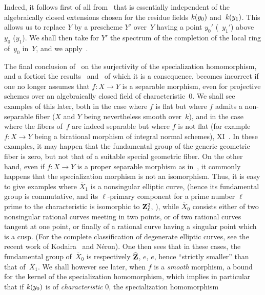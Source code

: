 Indeed, it follows first of all from~ that  is
essentially independent of the algebraically closed extensions
chosen for the residue fields $\mathit{k}(y_0)$
and~$\mathit{k}(y_1)$. This allows us to replace $Y$ by a
prescheme $Y'$ over~$Y$ having a point $y_0'$ (\resp~$y_1'$)
above~$y_0$ (\resp $y_1$). We shall then take for $Y'$ the
spectrum of the completion of the local ring of~$y_0$ in~$Y$, and we
apply~.

\begin{remarks}
\label{X.2.5}
The final conclusion of~ on the surjectivity of
the specialization homomorphism, and a fortiori the
results~ and~ of which it is a
consequence, becomes incorrect if one no longer assumes that $f\colon
X\to Y$ is a separable morphism, even for
projective schemes over an algebraically closed field of
characteristic~$0$. We shall see examples of this later, both
in the case where $f$ is flat but where $f$ admits a non-separable
fiber ($X$ and $Y$ being nevertheless smooth over~$k$), and
in the case where the fibers of~$f$ are indeed separable but
where $f$ is not flat (for example $f\colon X\to Y$ being a
birational morphism of integral normal schemes),
\cf XI~. In these examples, it may happen that the
fundamental group of the generic geometric fiber is
zero, but not that of a suitable special geometric
fiber. On the other hand, even if $f\colon X\to Y$ is a
proper separable morphism as in~, it
commonly happens that the specialization morphism is
not an isomorphism. Thus, it is easy to give examples
where $\overline X_1$ is a nonsingular elliptic curve,
(hence its fundamental group is commutative, and its
$\ell$-primary component for a prime number $\ell$ prime to the
characteristic is isomorphic to $\mathbf{Z}_\ell^2$, \cf {}),
while $\overline X_0$ consists either of two nonsingular
rational curves meeting in two points, or of
two rational curves tangent at one point, or finally of a
rational curve having a singular point which is a cusp.
(For the complete classification of degenerate elliptic
curves, see the recent work of Kodaira~\cite{X.1} and N\'eron).
One then sees that in these cases, the
fundamental group of~$\overline X_0$ is respectively $\widehat{\mathbf{Z}}$,
$e$, $e$, hence ``strictly smaller'' than that of~$\overline
X_1$. We shall however see later, when $f$ is a
\emph{smooth} morphism, a bound for the kernel of the
specialization homomorphism, which implies in particular that if $\mathit{k}(y_0)$ is
of \emph{characteristic} 0, the specialization homomorphism

\end{remarks}
